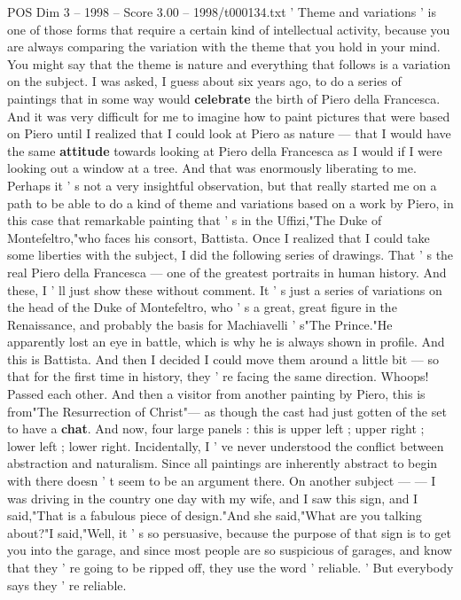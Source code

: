 \begin{textsample}{POS Dim 3 – 1998 – Score 3.00 – 1998/t000134.txt}  \label{ex:f3_pos_080}
' Theme and variations ' is one of those forms that require a certain kind of intellectual activity, because you are always comparing the variation with the theme that you hold in your mind.
You might say that the theme is nature and everything that follows is a variation on the subject.
I was asked, I guess about six years ago, to do a series of paintings that in some way would \textbf{celebrate} the birth of Piero della Francesca.
And it was very difficult for me to imagine how to paint pictures that were based on Piero until I realized that I could look at Piero as nature — that I would have the same \textbf{attitude} towards looking at Piero della Francesca as I would if I were looking out a window at a tree.
And that was enormously liberating to me.
Perhaps it ' s not a very insightful observation, but that really started me on a path to be able to do a kind of theme and variations based on a work by Piero, in this case that remarkable painting that ' s in the Uffizi,"The Duke of Montefeltro,"who faces his consort, Battista.
Once I realized that I could take some liberties with the subject, I did the following series of drawings.
That ' s the real Piero della Francesca — one of the greatest portraits in human history.
And these, I ' ll just show these without comment.
It ' s just a series of variations on the head of the Duke of Montefeltro, who ' s a great, great figure in the Renaissance, and probably the basis for Machiavelli ' s"The Prince."He apparently lost an eye in battle, which is why he is always shown in profile.
And this is Battista.
And then I decided I could move them around a little bit — so that for the first time in history, they ' re facing the same direction.
Whoops!
Passed each other.
And then a visitor from another painting by Piero, this is from"The Resurrection of Christ"— as though the cast had just gotten of the set to have a \textbf{chat}.
And now, four large panels : this is upper left ; upper right ; lower left ; lower right.
Incidentally, I ' ve never understood the conflict between abstraction and naturalism.
Since all paintings are inherently abstract to begin with there doesn ' t seem to be an argument there.
On another subject — — I was driving in the country one day with my wife, and I saw this sign, and I said,"That is a fabulous piece of design."And she said,"What are you talking about?"I said,"Well, it ' s so persuasive, because the purpose of that sign is to get you into the garage, and since most people are so suspicious of garages, and know that they ' re going to be ripped off, they use the word ' reliable. ' But everybody says they ' re reliable.

\end{textsample}
